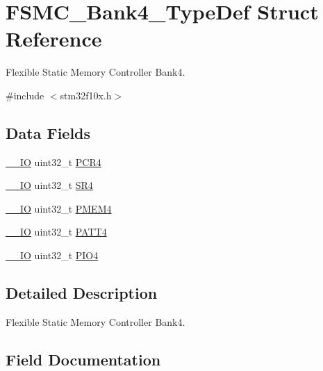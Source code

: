 \hypertarget{struct_f_s_m_c___bank4___type_def}{}\section{F\+S\+M\+C\+\_\+\+Bank4\+\_\+\+Type\+Def Struct Reference}
\label{struct_f_s_m_c___bank4___type_def}


Flexible Static Memory Controller Bank4.  




{\ttfamily \#include $<$stm32f10x.\+h$>$}

\subsection*{Data Fields}
\begin{DoxyCompactItemize}
\item 
\mbox{\hyperlink{core__sc300_8h_aec43007d9998a0a0e01faede4133d6be}{\+\_\+\+\_\+\+IO}} uint32\+\_\+t \mbox{\hyperlink{struct_f_s_m_c___bank4___type_def_a2f02e7acfbd7e549ede84633215eb6a1}{P\+C\+R4}}
\item 
\mbox{\hyperlink{core__sc300_8h_aec43007d9998a0a0e01faede4133d6be}{\+\_\+\+\_\+\+IO}} uint32\+\_\+t \mbox{\hyperlink{struct_f_s_m_c___bank4___type_def_a8218d6e11dae5d4468c69303dec0b4fc}{S\+R4}}
\item 
\mbox{\hyperlink{core__sc300_8h_aec43007d9998a0a0e01faede4133d6be}{\+\_\+\+\_\+\+IO}} uint32\+\_\+t \mbox{\hyperlink{struct_f_s_m_c___bank4___type_def_a3f82cc749845fb0dd7dfa8121d96b663}{P\+M\+E\+M4}}
\item 
\mbox{\hyperlink{core__sc300_8h_aec43007d9998a0a0e01faede4133d6be}{\+\_\+\+\_\+\+IO}} uint32\+\_\+t \mbox{\hyperlink{struct_f_s_m_c___bank4___type_def_a955cad1aab7fb2d5b6e216cb29b5e7e2}{P\+A\+T\+T4}}
\item 
\mbox{\hyperlink{core__sc300_8h_aec43007d9998a0a0e01faede4133d6be}{\+\_\+\+\_\+\+IO}} uint32\+\_\+t \mbox{\hyperlink{struct_f_s_m_c___bank4___type_def_ac53cd7a08093a4ae8f4de4bcff67a64f}{P\+I\+O4}}
\end{DoxyCompactItemize}


\subsection{Detailed Description}
Flexible Static Memory Controller Bank4. 

\subsection{Field Documentation}
\mbox{\label{struct_f_s_m_c___bank4___type_def_a955cad1aab7fb2d5b6e216cb29b5e7e2}} 
